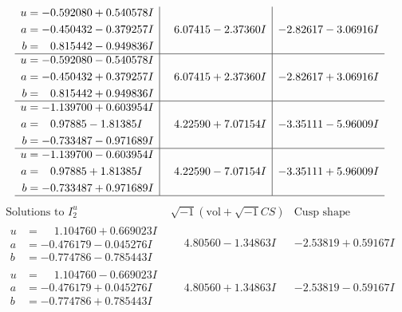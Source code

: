 \documentclass[1p]{elsarticle_modified}
\theoremstyle{definition}
\newcommand{\I}{\sqrt{-1}}
\begin{document}
$$\begin{array}{c|c|c}
\begin{aligned}
u &= -0.592080 + 0.540578 I \\
a &= -0.450432 - 0.379257 I \\
b &= \phantom{-}0.815442 - 0.949836 I\end{aligned}
 & \phantom{-}6.07415 - 2.37360 I & -2.82617 - 3.06916 I \\ \hline\begin{aligned}
u &= -0.592080 - 0.540578 I \\
a &= -0.450432 + 0.379257 I \\
b &= \phantom{-}0.815442 + 0.949836 I\end{aligned}
 & \phantom{-}6.07415 + 2.37360 I & -2.82617 + 3.06916 I \\ \hline\begin{aligned}
u &= -1.139700 + 0.603954 I \\
a &= \phantom{-}0.97885 - 1.81385 I \\
b &= -0.733487 - 0.971689 I\end{aligned}
 & \phantom{-}4.22590 + 7.07154 I & -3.35111 - 5.96009 I \\ \hline\begin{aligned}
u &= -1.139700 - 0.603954 I \\
a &= \phantom{-}0.97885 + 1.81385 I \\
b &= -0.733487 + 0.971689 I\end{aligned}
 & \phantom{-}4.22590 - 7.07154 I & -3.35111 + 5.96009 I\\
 \hline 
 \end{array}$$\newpage$$\begin{array}{c|c|c}  
\text{Solutions to }I^u_{2}& \I (\text{vol} + \sqrt{-1}CS) & \text{Cusp shape}\\
 \hline 
\begin{aligned}
u &= \phantom{-}1.104760 + 0.669023 I \\
a &= -0.476179 - 0.045276 I \\
b &= -0.774786 - 0.785443 I\end{aligned}
 & \phantom{-}4.80560 - 1.34863 I & -2.53819 + 0.59167 I \\ \hline\begin{aligned}
u &= \phantom{-}1.104760 - 0.669023 I \\
a &= -0.476179 + 0.045276 I \\
b &= -0.774786 + 0.785443 I\end{aligned}
 & \phantom{-}4.80560 + 1.34863 I & -2.53819 - 0.59167 I \\ \hline\begin{aligned}

\end{aligned}
\end{array}$$
\end{document}

